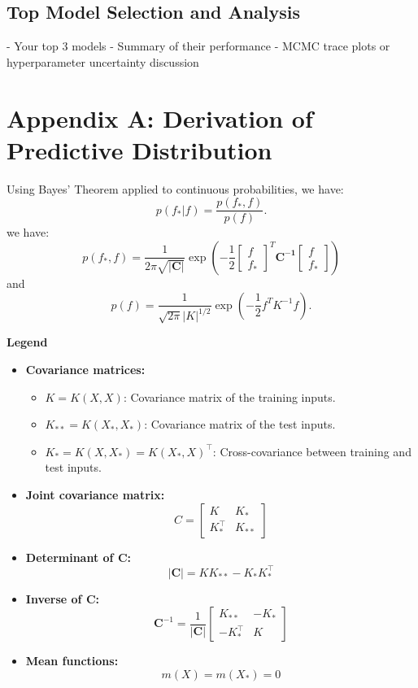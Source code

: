 \documentclass{article}
\begin{document}
\subsection{Top Model Selection and Analysis}
- Your top 3 models
- Summary of their performance
- MCMC trace plots or hyperparameter uncertainty discussion



\appendix

\section{Appendix A: Derivation of Predictive Distribution}
\label{appendix:A}
Using Bayes' Theorem applied to continuous probabilities, we have:
\[
p(f_* | f) = \frac{p(f_*, f)}{p(f)}.
\]
we have:
$$p(f_*,f) = \frac{1}{2\pi\sqrt{\mathbf{|C|}}}\exp \left(-\frac{1}{2} 
\begin{bmatrix} f \\ f_*  \end{bmatrix}^T\mathbf{C^{-1}}\begin{bmatrix} f  \\ f_* \end{bmatrix}\right)$$
and 
\[
p(f) = \frac{1}{\sqrt{2\pi} |K|^{1/2}}
\exp \left(-\frac{1}{2} f^T K^{-1} f \right).
\]

\noindent
\textbf{Legend}
\begin{itemize}
    \item \textbf{Covariance matrices:}
    \begin{itemize}
        \item \( K = K(X, X) \): Covariance matrix of the training inputs.
        \item \( K_{**} = K(X_*, X_*) \): Covariance matrix of the test inputs.
        \item \( K_* = K(X, X_*) = K(X_*, X)^\top \): Cross-covariance between training and test inputs.
    \end{itemize}
    
    \item \textbf{Joint covariance matrix:}
    \[
    C = \begin{bmatrix}
    K & K_* \\
    K_*^\top & K_{**}
    \end{bmatrix}
    \]
    
    \item \textbf{Determinant of \( \mathbf{C} \):}
    \[
    |\mathbf{C}| = K K_{**} - K_* K_*^\top
    \]
    
    \item \textbf{Inverse of \( \mathbf{C} \):}
    \[
    \mathbf{C}^{-1} = \frac{1}{|\mathbf{C}|}
    \begin{bmatrix}
    K_{**} & -K_* \\
    -K_*^\top & K
    \end{bmatrix}
    \]
    
    \item \textbf{Mean functions:}
    \[
    m(X) = m(X_*) = 0
    \]
\end{itemize}
\end{document}
